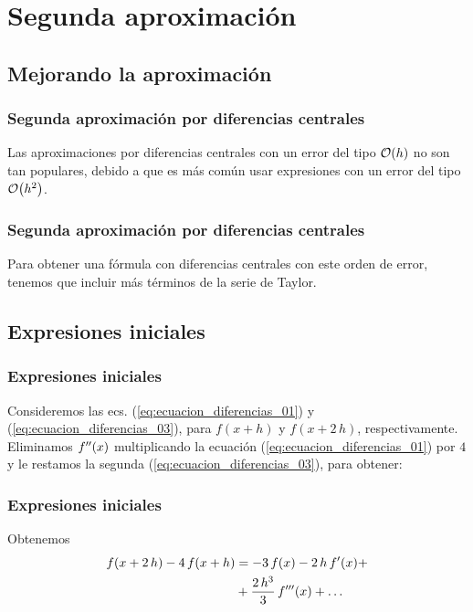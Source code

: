 \section{Segunda aproximación}
\subsection*{Mejorando la aproximación}
\begin{frame}
\frametitle{Segunda aproximación por diferencias centrales}
Las aproximaciones por diferencias centrales con un error del tipo $\order{h}$ no son tan populares, debido a que es más común usar expresiones con un error del tipo $\order{h^{2}}$.
\end{frame}
\begin{frame}
\frametitle{Segunda aproximación por diferencias centrales}
Para obtener una fórmula con diferencias centrales con este orden de error, tenemos que incluir más términos de la serie de Taylor.
\end{frame}
\subsection*{Expresiones iniciales}
\begin{frame}
\frametitle{Expresiones iniciales}
Consideremos las ecs. (\ref{eq:ecuacion_diferencias_01}) y (\ref{eq:ecuacion_diferencias_03}), para $f(x + h)$ y $f(x + 2 \, h)$, respectivamente.
\\
\bigskip
Eliminamos ${f}^{\prime \prime}(x)$ multiplicando la ecuación (\ref{eq:ecuacion_diferencias_01}) por $4$ y le restamos la segunda (\ref{eq:ecuacion_diferencias_03}), para obtener:
\end{frame}
\begin{frame}
\frametitle{Expresiones iniciales}
Obtenemos
\begin{align*}
f(x + 2 \, h) - 4 \, f(x + h) &= -3 \, f(x) - 2 \, h \, {f}^{\prime}(x) + \\
&+ \dfrac{2 \, h^{3}}{3} \, {f}^{\prime \prime \prime}(x) + \ldots
\end{align*}
\end{frame}
